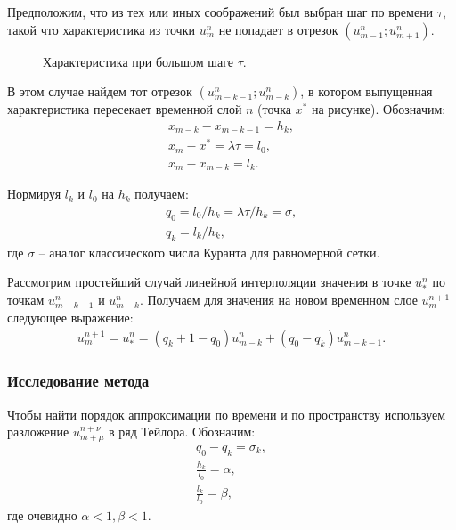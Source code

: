 Предположим, что из тех или иных соображений был выбран шаг по времени $\tau$, такой что характеристика из точки $u_m^n$ не попадает в отрезок $(u_{m-1}^n; u_{m+1}^n)$.

\begin{figure}[h]
\caption{Характеристика при большом шаге $\tau$.}
\end{figure}

В этом случае найдем тот отрезок $(u_{m-k-1}^n; u_{m-k}^n)$, в котором выпущенная характеристика пересекает временной слой $n$ (точка $x^*$ на рисунке). Обозначим:
\begin{eqnarray}
x_{m-k} - x_{m-k-1} = h_k,\nonumber\\
x_m - x^* = \lambda \tau = l_0,\nonumber\\
x_m - x_{m-k} = l_k.
\end{eqnarray}

Нормируя $l_k$ и $l_0$ на $h_k$ получаем:
\begin{eqnarray}
q_0 = l_0 / h_k = \lambda \tau / h_k = \sigma,\nonumber\\
q_k = l_k / h_k,
\end{eqnarray}
где $\sigma$ -- аналог классического числа Куранта для равномерной сетки.

Рассмотрим простейший случай линейной интерполяции значения в точке $u_*^n$ по точкам  $u_{m-k-1}^n$ и $u_{m-k}^n$. Получаем для значения на новом временном слое $u_m^{n+1}$ следующее выражение:
\begin{eqnarray}
\label{newmethod_1d_scheme}
u_m^{n+1} = u_*^n = (q_k + 1 - q_0) u_{m-k}^n + (q_0 - q_k) u_{m-k-1}^n.
\end{eqnarray}

\clearpage
\newpage

\subsubsection{Исследование метода}

Чтобы найти порядок аппроксимации по времени и по пространству используем разложение $u_{m+\mu}^{n+\nu}$ в ряд Тейлора. Обозначим:
\begin{eqnarray}
q_0 - q_k = \sigma_k,\nonumber\\
\frac{h_k}{l_0} = \alpha,\nonumber\\
\frac{l_k}{l_0} = \beta,
\end{eqnarray}
где очевидно $\alpha < 1, \beta < 1$.

